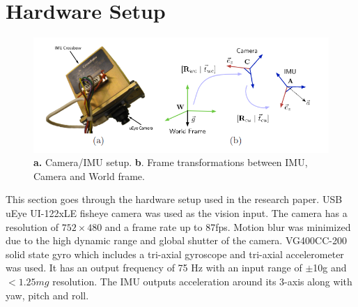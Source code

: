 \section{Hardware Setup}
\label{hardware_setup}

\begin{figure}[H]
  \includegraphics[width=\textwidth]{./figures/imucam.png}
\caption{\textbf{a.} Camera/IMU setup. \textbf{b}. Frame transformations between IMU, Camera and World frame.}
\label{fig:setup1}       %
\end{figure}

This section goes through the hardware setup used in the research paper. USB uEye UI-122xLE fisheye camera was used as the vision input. The camera has a resolution of $752 × 480$ and a frame rate up to 87fps. Motion blur was minimized due to the high dynamic range and global shutter of the camera. VG400CC-200 solid state gyro which includes a tri-axial gyroscope and tri-axial accelerometer was used. It has an output frequency of 75 Hz with an input range of $\pm$10g and $<1.25mg$ resolution. The IMU outputs acceleration around its 3-axis along with yaw, pitch and roll.
